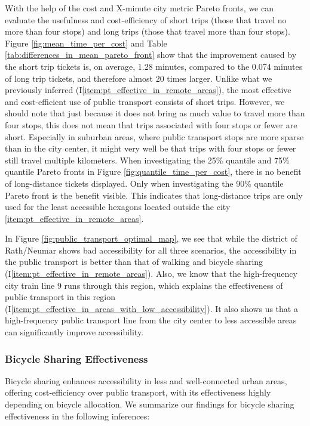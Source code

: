 With the help of the cost and X-minute city metric Pareto fronts, we can evaluate the usefulness and cost-efficiency of short trips (those that travel no more than four stops) and long trips (those that travel more than four stops).
Figure \ref{fig:mean_time_per_cost} and Table \ref{tab:differences_in_mean_pareto_front} show that the improvement caused by the short trip tickets is, on average, 1.28 minutes, compared to the 0.074 minutes of long trip tickets, and therefore almost 20 times larger.
Unlike what we previously inferred (I\ref{item:pt_effective_in_remote_areas}), the most effective and cost-efficient use of public transport consists of short trips.
However, we should note that just because it does not bring as much value to travel more than four stops, this does not mean that trips associated with four stops or fewer are short.
Especially in suburban areas, where public transport stops are more sparse than in the city center, it might very well be that trips with four stops or fewer still travel multiple kilometers.
When investigating the 25\% quantile and 75\% quantile Pareto fronts in Figure \ref{fig:quantile_time_per_cost}, there is no benefit of long-distance tickets displayed.
Only when investigating the 90\% quantile Pareto front is the benefit visible.
This indicates that long-distance trips are only used for the least accessible hexagons located outside the city \ref{item:pt_effective_in_remote_areas}.

In Figure \ref{fig:public_transport_optimal_map}, we see that while the district of Rath/Neumar shows bad accessibility for all three scenarios, the accessibility in the public transport is better than that of walking and bicycle sharing (I\ref{item:pt_effective_in_remote_areas}).
Also, we know that the high-frequency city train line 9 runs through this region, which explains the effectiveness of public transport in this region (I\ref{item:pt_effective_in_areas_with_low_accessibility}).
It also shows us that a high-frequency public transport line from the city center to less accessible areas can significantly improve accessibility.

\subsubsection{Bicycle Sharing Effectiveness}
Bicycle sharing enhances accessibility in less and well-connected urban areas, offering cost-efficiency over public transport, with its effectiveness highly depending on bicycle allocation.
We summarize our findings for bicycle sharing effectiveness in the following inferences:

